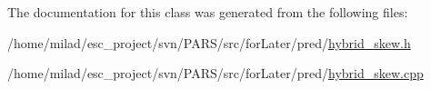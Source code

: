 The documentation for this class was generated from the following files:\begin{DoxyCompactItemize}
\item 
/home/milad/esc\_\-project/svn/PARS/src/forLater/pred/\hyperlink{hybrid__skew_8h}{hybrid\_\-skew.h}\item 
/home/milad/esc\_\-project/svn/PARS/src/forLater/pred/\hyperlink{hybrid__skew_8cpp}{hybrid\_\-skew.cpp}\end{DoxyCompactItemize}
